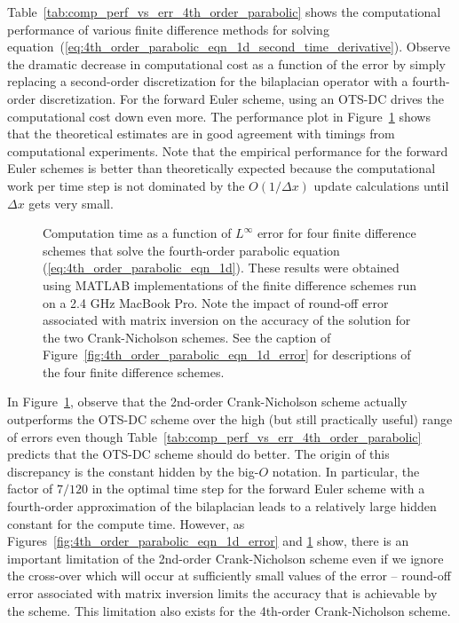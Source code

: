 \documentclass[fleqn,12pt,twoside]{article}
\def\dx{\Delta x}
\begin{document}
Table~\ref{tab:comp_perf_vs_err_4th_order_parabolic} shows the computational 
performance of various finite difference methods for solving 
equation~(\ref{eq:4th_order_parabolic_eqn_1d_second_time_derivative}).
Observe the dramatic decrease in computational cost as a function of the
error by simply replacing a second-order discretization for the bilaplacian 
operator with a fourth-order discretization.  For the forward Euler scheme,
using an OTS-DC drives the computational cost down even more.
The performance plot in Figure~\ref{fig:4th_order_parabolic_eqn_1d_perf} 
shows that the theoretical estimates are in good agreement with timings 
from computational experiments.  Note that the empirical performance for the 
forward Euler schemes is better than theoretically expected because the 
computational work per time step is not dominated by the 
$O(1/\dx)$ update calculations until $\dx$ gets very small.

\begin{figure}[tb]
\begin{center}
\caption{Computation time as a function of $L^\infty$ error for four
finite difference schemes that solve the fourth-order parabolic equation
(\ref{eq:4th_order_parabolic_eqn_1d}).  
These results were obtained using MATLAB implementations of the 
finite difference schemes run on a 2.4 GHz MacBook Pro.
Note the impact of round-off error associated with matrix inversion on 
the accuracy of the solution for the two Crank-Nicholson schemes.
See the caption of Figure~\ref{fig:4th_order_parabolic_eqn_1d_error} for 
descriptions of the four finite difference schemes.
}
\label{fig:4th_order_parabolic_eqn_1d_perf}
\end{center}
\end{figure}

In Figure~\ref{fig:4th_order_parabolic_eqn_1d_perf}, observe that the 
2nd-order Crank-Nicholson scheme actually outperforms the OTS-DC scheme over 
the high (but still practically useful) range of errors even though 
Table~\ref{tab:comp_perf_vs_err_4th_order_parabolic} predicts that the OTS-DC
scheme should do better.  The origin of this discrepancy is the constant 
hidden by the big-$O$ notation.  In particular, the factor of $7/120$ in 
the optimal time step for the forward Euler scheme with a fourth-order 
approximation of the bilaplacian leads to a relatively large hidden constant 
for the compute time. 
However, as Figures~\ref{fig:4th_order_parabolic_eqn_1d_error} and
\ref{fig:4th_order_parabolic_eqn_1d_perf} show, there is an important 
limitation of the 2nd-order Crank-Nicholson scheme even if we ignore the 
cross-over which will occur at sufficiently small values of the error -- 
round-off error associated with matrix inversion limits the accuracy that is 
achievable by the scheme.  This limitation also exists for the 4th-order 
Crank-Nicholson scheme. 
\end{document}
